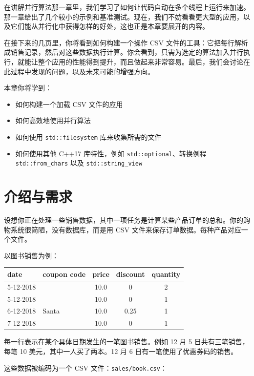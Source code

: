 在讲解并行算法那一章里，我们学习了如何让代码自动在多个线程上运行来加速。那一章给出了几个较小的示例和基准测试。现在，我们不妨看看更大型的应用，以及它们能从并行化中获得怎样的好处，这也正是本章要展开的内容。

在接下来的几页里，你将看到如何构建一个操作 CSV 文件的工具：它把每行解析成销售记录，然后对这些数据执行计算。你会看到，只需为选定的算法加入并行执行，就能让整个应用的性能得到提升，而且做起来非常容易。最后，我们会讨论在此过程中发现的问题，以及未来可能的增强方向。

本章你将学到：
\begin{itemize}
\item 如何构建一个加载 CSV 文件的应用
\item 如何高效地使用并行算法
\item 如何使用 \texttt{std::filesystem} 库来收集所需的文件
\item 如何使用其他 C++17 库特性，例如 \texttt{std::optional}、转换例程 \texttt{std::from\_chars} 以及 \texttt{std::string\_view}
\end{itemize}

\section{介绍与需求}

设想你正在处理一些销售数据，其中一项任务是计算某些产品订单的总和。你的购物系统很简陋，没有数据库，而是用 CSV 文件来保存订单数据。每种产品对应一个文件。

以图书销售为例：

\begin{table}[H]
\centering
\begin{tabularx}{\textwidth}{l l c c c}
\toprule
date & coupon code & price & discount & quantity \\
\midrule
5-12-2018 &          & 10.0 & 0    & 2 \\
5-12-2018 &          & 10.0 & 0    & 1 \\
6-12-2018 & Santa    & 10.0 & 0.25 & 1 \\
7-12-2018 &          & 10.0 & 0    & 1 \\
\bottomrule
\end{tabularx}
\end{table}

每一行表示在某个具体日期发生的一笔图书销售。例如 12 月 5 日共有三笔销售，每笔 10 美元，其中一人买了两本。12 月 6 日有一笔使用了优惠券码的销售。

这些数据被编码为一个 CSV 文件：\texttt{sales/book.csv}：

